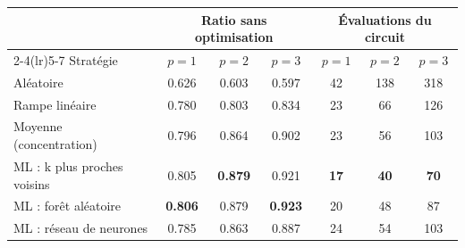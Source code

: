 \begin{tabular}{lcccccc}
\toprule
 & \multicolumn{3}{c}{Ratio sans optimisation} & \multicolumn{3}{c}{Évaluations du circuit} \\
\cmidrule(lr){2-4}\cmidrule(lr){5-7}
Stratégie & $p=1$ & $p=2$ & $p=3$ & $p=1$ & $p=2$ & $p=3$ \\
\midrule
Aléatoire & 0.626 & 0.603 & 0.597 & 42 & 138 & 318 \\
Rampe linéaire & 0.780 & 0.803 & 0.834 & 23 & 66 & 126 \\
Moyenne (concentration) & 0.796 & 0.864 & 0.902 & 23 & 56 & 103 \\
\midrule
ML : k plus proches voisins & 0.805 & \textbf{0.879} & 0.921 & \textbf{17} & \textbf{40} & \textbf{70} \\
ML : forêt aléatoire & \textbf{0.806} & 0.879 & \textbf{0.923} & 20 & 48 & 87 \\
ML : réseau de neurones & 0.785 & 0.863 & 0.887 & 24 & 54 & 103 \\
\bottomrule
\end{tabular}